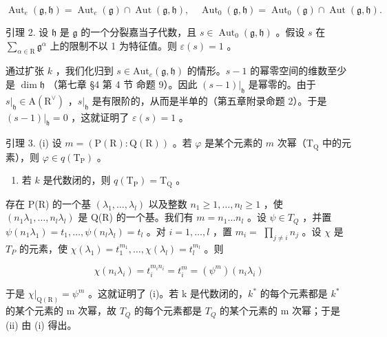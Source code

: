 \[
\operatorname{Aut} _ {e} (\mathfrak {g}, \mathfrak {h}) = \operatorname{Aut} _ {e} (\mathfrak {g}) \cap \operatorname{Aut} (\mathfrak {g}, \mathfrak {h}), \quad \operatorname{Aut} _ {0} (\mathfrak {g}, \mathfrak {h}) = \operatorname{Aut} _ {0} (\mathfrak {g}) \cap \operatorname{Aut} (\mathfrak {g}, \mathfrak {h}).
\]

引理 2. 设 \(\mathfrak{h}\) 是 \(\mathfrak{g}\) 的一个分裂嘉当子代数，且 \(s \in \operatorname{Aut}_0(\mathfrak{g}, \mathfrak{h})\) 。假设 \(s\) 在 \(\sum_{\alpha \in \mathrm{R}} \mathfrak{g}^\alpha\) 上的限制不以 1 为特征值。则 \(\varepsilon(s) = 1\) 。

通过扩张 \(k\) ，我们化归到 \(s \in \mathrm{Aut}_e(\mathfrak{g}, \mathfrak{h})\) 的情形。\(s - 1\) 的幂零空间的维数至少是 \(\dim \mathfrak{h}\) （第七章 §4 第 4 节 命题 9）。因此 \((s - 1)|_{\mathfrak{h}}\) 是幂零的。由于 \(s|_{\mathfrak{h}} \in \mathrm{A}(\mathrm{R}^\vee)\) ，\(s|_{\mathfrak{h}}\) 是有限阶的，从而是半单的（第五章附录命题 2）。于是 \((s - 1)|_{\mathfrak{h}} = 0\) ，这就证明了 \(\varepsilon(s) = 1\) 。

引理 3. (i) 设 \(m = (\mathrm{P}(\mathrm{R}) : \mathrm{Q}(\mathrm{R}))\) 。若 \(\varphi\) 是某个元素的 \(m\) 次幂（\(\mathrm{T}_{\mathrm{Q}}\) 中的元素），则 \(\varphi \in q(\mathrm{T}_{\mathrm{P}})\) 。

\begin{enumerate}
\def\labelenumi{(\roman{enumi})}
\setcounter{enumi}{1}
\tightlist
\item
  若 \(k\) 是代数闭的，则 \(q(\mathrm{T}_{\mathrm{P}}) = \mathrm{T}_{\mathrm{Q}}\) 。
\end{enumerate}

存在 P(R) 的一个基 \((\lambda_{1},\ldots,\lambda_{l})\) 以及整数 \(n_{1}\geq1,\ldots,n_{l}\geq1\) ，使 \((n_{1}\lambda_{1},\ldots,n_{l}\lambda_{l})\) 是 Q(R) 的一个基。我们有 \(m=n_{1}\ldots n_{l}\) 。设 \(\psi\in T_{Q}\) ，并置 \(\psi(n_{1}\lambda_{1})=t_{1},\ldots,\psi(n_{l}\lambda_{l})=t_{l}\) 。对 \(i=1,\ldots,l\) ，置 \(m_{i}=\) \(\prod_{j \neq i} n_j\) 。设 \(\chi\) 是 \(T_P\) 的元素，使 \(\chi(\lambda_1) = t_1^{m_1}, \ldots, \chi(\lambda_l) = t_l^{m_l}\) 。则

\[
\chi (n _ {i} \lambda_ {i}) = t _ {i} ^ {m _ {i} n _ {i}} = t _ {i} ^ {m} = (\psi^ {m}) (n _ {i} \lambda_ {i})
\]

于是 \(\chi|_{\mathrm{Q}(\mathrm{R})}=\psi^{m}\) 。这就证明了 (i)。若 k 是代数闭的，\(k^{*}\) 的每个元素都是 \(k^{*}\) 的某个元素的 m 次幂，故 \(T_{Q}\) 的每个元素都是 \(T_{Q}\) 的某个元素的 m 次幂；于是 (ii) 由 (i) 得出。

